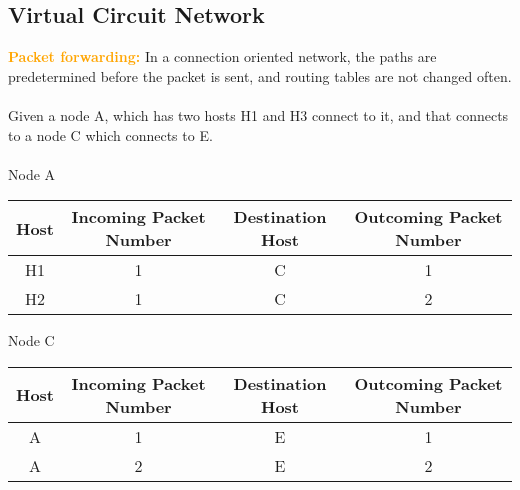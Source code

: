 \documentclass[a4paper,10pt]{article}
\begin{document}
\subsection{Virtual Circuit Network}
\textcolor{Orange}{\textbf{Packet forwarding:}} In a connection oriented network, the paths are predetermined before the packet is sent, and routing tables are not changed often. \\\\ 
Given a node A, which has two hosts H1 and H3 connect to it, and that connects to a node C which connects to E. \\\\
Node A
\begin{center}
	\begin{tabular}{|c|c| |c|c|}
		\hline
		Host &Incoming Packet Number &Destination Host &Outcoming Packet Number \\
		\hline
		H1 &1 &C &1 \\
		\hline
		H2 &1 &C &2 \\
		\hline
	\end{tabular}
\end{center}
Node C
\begin{center}
	\begin{tabular}{|c|c| |c|c|}
		\hline
		Host &Incoming Packet Number &Destination Host &Outcoming Packet Number \\
		\hline
		A &1 &E &1 \\
		\hline
		A &2 &E &2 \\
		\hline
	\end{tabular}
\end{center}
\end{document}
